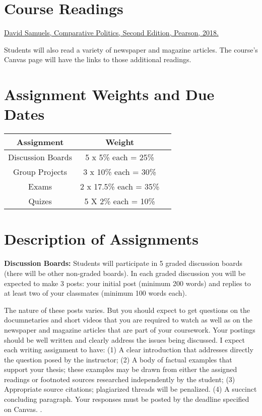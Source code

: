 \documentclass[11pt,]{article}
\begin{document}
\hypertarget{course-readings}{%
\section{Course Readings}\label{course-readings}}

\href{https://www.pearson.com/us/higher-education/product/Samuels-Comparative-Politics-RENTAL-EDITION-2nd-Edition/9780134562674.html}{David
Samuels, Comparative Politics, Second Edition, Pearson, 2018.}

Students will also read a variety of newspaper and magazine articles.
The course's Canvas page will have the links to those additional
readings.

\hypertarget{assignment-weights-and-due-dates}{%
\section{Assignment Weights and Due
Dates}\label{assignment-weights-and-due-dates}}

\begin{longtable}[]{@{}ccc@{}}
\toprule()
\textbf{Assignment} & \textbf{Weight} & \\
\midrule()
\endhead
Discussion Boards & 5 x 5\% each = 25\% & \\
Group Projects & 3 x 10\% each = 30\% & \\
Exams & 2 x 17.5\% each = 35\% & \\
Quizes & 5 X 2\% each = 10\% & \\
\bottomrule()
\end{longtable}

\hypertarget{description-of-assignments}{%
\section{Description of Assignments}\label{description-of-assignments}}

\textbf{Discussion Boards:} Students will participate in 5 graded
discussion boards (there will be other non-graded boards). In each
graded discussion you will be expected to make 3 posts: your initial
post (minimum 200 words) and replies to at least two of your classmates
(minimum 100 words each).

The nature of these posts varies. But you should expect to get questions
on the documnetaries and short videos that you are required to watch as
well as on the newspaper and magazine articles that are part of your
coursework. Your postings should be well written and clearly address the
issues being discussed. I expect each writing assignment to have: (1) A
clear introduction that addresses directly the question posed by the
instructor; (2) A body of factual examples that support your thesis;
these examples may be drawn from either the assigned readings or
footnoted sources researched independently by the student; (3)
Appropriate source citations; plagiarized threads will be penalized. (4)
A succinct concluding paragraph. Your responses must be posted by the
deadline specified on Canvas. .
\end{document}
